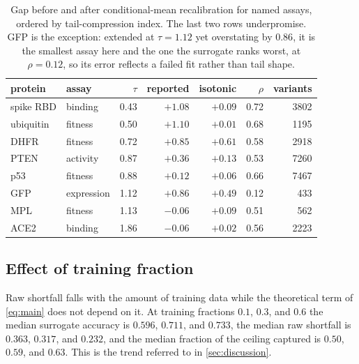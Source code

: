 \documentclass{article}
\theoremstyle{plain}
\theoremstyle{definition}
\begin{document}
\begin{table}[ht]
\caption{Gap before and after conditional-mean recalibration for named assays, ordered
by tail-compression index. The last two rows underpromise. GFP is the exception:
extended at $\tau = 1.12$ yet overstating by $0.86$, it is the smallest assay here and
the one the surrogate ranks worst, at $\rho = 0.12$, so its error reflects a failed fit
rather than tail shape.}
\label{tab:named}
\vskip 0.1in
\begin{center}
\begin{small}
\begin{tabular}{llrrrrr}
\toprule
protein & assay & $\tau$ & reported & isotonic & $\rho$ & variants \\
\midrule
spike RBD  & binding    & 0.43 & $+1.08$ & $+0.09$ & 0.72 & 3802 \\
ubiquitin  & fitness    & 0.50 & $+1.10$ & $+0.01$ & 0.68 & 1195 \\
DHFR       & fitness    & 0.72 & $+0.85$ & $+0.61$ & 0.58 & 2918 \\
PTEN       & activity   & 0.87 & $+0.36$ & $+0.13$ & 0.53 & 7260 \\
p53        & fitness    & 0.88 & $+0.12$ & $+0.06$ & 0.66 & 7467 \\
GFP        & expression & 1.12 & $+0.86$ & $+0.49$ & 0.12 & \phantom{0}433 \\
MPL        & fitness    & 1.13 & $-0.06$ & $+0.09$ & 0.51 & \phantom{0}562 \\
ACE2       & binding    & 1.86 & $-0.06$ & $+0.02$ & 0.56 & 2223 \\
\bottomrule
\end{tabular}
\end{small}
\end{center}
\vskip -0.1in
\end{table}

\subsection{Effect of training fraction}
\label{app:frac}

Raw shortfall falls with the amount of training data while the theoretical term of
\cref{eq:main} does not depend on it. At training fractions $0.1$, $0.3$, and $0.6$ the
median surrogate accuracy is $0.596$, $0.711$, and $0.733$, the median raw shortfall is
$0.363$, $0.317$, and $0.232$, and the median fraction of the ceiling captured is
$0.50$, $0.59$, and $0.63$. This is the trend referred to in \cref{sec:discussion}.
\end{document}
